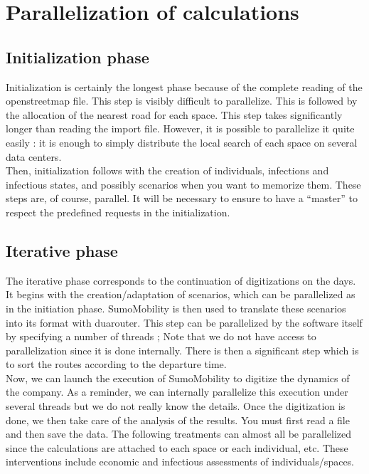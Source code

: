 \chapter{Parallelization of calculations}

\section{Initialization phase}

Initialization is certainly the longest phase because of the complete reading of the openstreetmap file. This step is visibly difficult to parallelize. This is followed by the allocation of the nearest road for each space. This step takes significantly longer than reading the import file. However, it is possible to parallelize it quite easily : it is enough to simply distribute the local search of each space on several
data centers.\\

Then, initialization follows with the creation of individuals, infections and infectious states, and possibly scenarios when you want to memorize them. These steps are, of course, parallel. It will be necessary to ensure to have a ``master'' to respect the predefined requests in the initialization.\\

\section{Iterative phase}

The iterative phase corresponds to the continuation of digitizations on the days. It begins with the creation/adaptation of scenarios, which can be parallelized as in the initiation phase. SumoMobility is then used to translate these scenarios into its format with duarouter. This step can be parallelized by the software itself by specifying a number of threads ; Note that we do not have access to parallelization
since it is done internally. There is then a significant step which is to sort the routes according to the departure time.\\

Now, we can launch the execution of SumoMobility to digitize the dynamics of the company. As a reminder, we can internally parallelize this execution under several threads but we do not really know the details. Once the digitization is done, we then take care of the analysis of the results. You must first read a file and then save the data. The following treatments can almost all be parallelized since the calculations are attached to each space or each individual, etc. These interventions include economic and infectious assessments of individuals/spaces.

